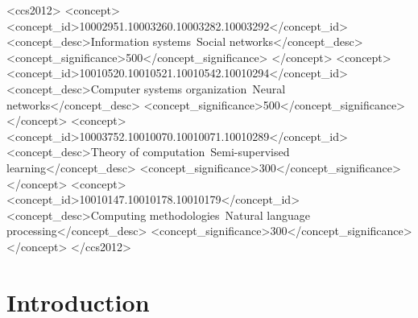 \documentclass[sigconf]{acmart}
\theoremstyle{definition}
\theoremstyle{hypothesis}
\begin{document}

\begin{CCSXML}
<ccs2012>
<concept>
<concept_id>10002951.10003260.10003282.10003292</concept_id>
<concept_desc>Information systems~Social networks</concept_desc>
<concept_significance>500</concept_significance>
</concept>
<concept>
<concept_id>10010520.10010521.10010542.10010294</concept_id>
<concept_desc>Computer systems organization~Neural networks</concept_desc>
<concept_significance>500</concept_significance>
</concept>
<concept>
<concept_id>10003752.10010070.10010071.10010289</concept_id>
<concept_desc>Theory of computation~Semi-supervised learning</concept_desc>
<concept_significance>300</concept_significance>
</concept>
<concept>
<concept_id>10010147.10010178.10010179</concept_id>
<concept_desc>Computing methodologies~Natural language processing</concept_desc>
<concept_significance>300</concept_significance>
</concept>
</ccs2012>
\end{CCSXML}


\maketitle

\section{Introduction}\label{sec:introduction}
\end{document}
